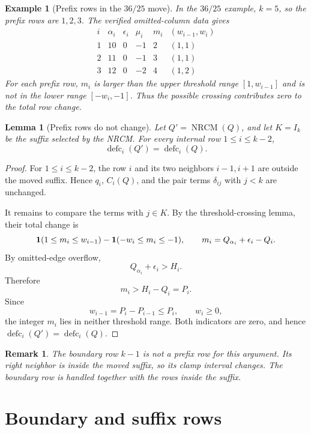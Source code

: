 \documentclass[10pt]{article}
\newtheorem{lemma}{Lemma}
\newtheorem{example}{Example}
\newtheorem{remark}{Remark}
\newcommand{\defc}{\operatorname{defc}}
\newcommand{\NRCM}{\operatorname{NRCM}}
\begin{document}
\begin{example}[Prefix rows in the \(36/25\) move]
In the \(36/25\) example, \(k=5\), so the prefix rows are \(1,2,3\).  The
verified omitted-column data gives
\[
\begin{array}{c|c|c|c|c|c}
i & \alpha_i & \epsilon_i & \mu_i & m_i & (w_{i-1},w_i)\\ \hline
1 & 10 & 0 & -1 & 2 & (1,1)\\
2 & 11 & 0 & -1 & 3 & (1,1)\\
3 & 12 & 0 & -2 & 4 & (1,2)
\end{array}
\]
For each prefix row, \(m_i\) is larger than the upper threshold range
\([1,w_{i-1}]\) and is not in the lower range \([-w_i,-1]\).  Thus the
possible crossing contributes zero to the total row change.
\end{example}

\begin{lemma}[Prefix rows do not change]
Let \(Q'=\NRCM(Q)\), and let \(K=I_k\) be the suffix selected by the NRCM.
For every internal row \(1\le i\le k-2\),
\[
  \defc_i(Q')=\defc_i(Q).
\]
\end{lemma}

\begin{proof}
For \(1\le i\le k-2\), the row \(i\) and its two neighbors \(i-1,i+1\) are
outside the moved suffix.  Hence \(q_i\), \(C_i(Q)\), and the pair terms
\(\delta_{ij}\) with \(j<k\) are unchanged.

It remains to compare the terms with \(j\in K\).  By the threshold-crossing
lemma, their total change is
\[
  {\bf 1}(1\le m_i\le w_{i-1})
  -
  {\bf 1}(-w_i\le m_i\le -1),
  \qquad
  m_i=Q_{\alpha_i}+\epsilon_i-Q_i.
\]
By omitted-edge overflow,
\[
  Q_{\alpha_i}+\epsilon_i>H_i.
\]
Therefore
\[
  m_i>H_i-Q_i=P_i.
\]
Since
\[
  w_{i-1}=P_i-P_{i-1}\le P_i,
  \qquad
  w_i\ge0,
\]
the integer \(m_i\) lies in neither threshold range.  Both indicators are
zero, and hence \(\defc_i(Q')=\defc_i(Q)\).
\end{proof}

\begin{remark}
The boundary row \(k-1\) is not a prefix row for this argument.  Its right
neighbor is inside the moved suffix, so its clamp interval changes.  The
boundary row is handled together with the rows inside the suffix.
\end{remark}

\section{Boundary and suffix rows}
\end{document}
